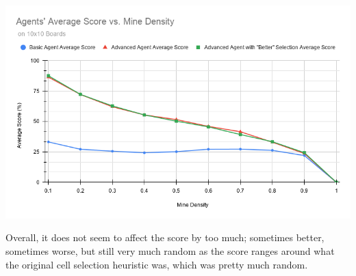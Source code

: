\documentclass[11pt]{article} %
\begin{document}
\begin{center}
\includegraphics*[scale=0.5]{plot2.png}\\
\end{center}

Overall, it does not seem to affect the score by too much; sometimes better, sometimes worse, but still very much random as the score ranges around what the original cell selection heuristic was, which was pretty much random.
\end{document}
